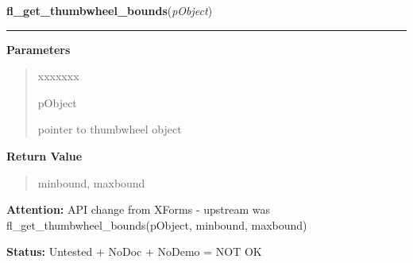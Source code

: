 \hspace{.8\funcindent}\begin{boxedminipage}{\funcwidth}

    \raggedright \textbf{fl\_get\_thumbwheel\_bounds}(\textit{pObject})

    \vspace{-1.5ex}

    \rule{\textwidth}{0.5\fboxrule}
\setlength{\parskip}{2ex}
\setlength{\parskip}{1ex}
      \textbf{Parameters}
      \vspace{-1ex}

      \begin{quote}
        \begin{Ventry}{xxxxxxx}

          \item[pObject]

          pointer to thumbwheel object

        \end{Ventry}

      \end{quote}

      \textbf{Return Value}
    \vspace{-1ex}

      \begin{quote}
      minbound, maxbound

      \end{quote}

\textbf{Attention:} API change from XForms - upstream was fl\_get\_thumbwheel\_bounds(pObject, 
minbound, maxbound)



\textbf{Status:} Untested + NoDoc + NoDemo = NOT OK



    \end{boxedminipage}

    \label{xformslib:library:fl_add_thumbwheel}

    \vspace{0.5ex}

